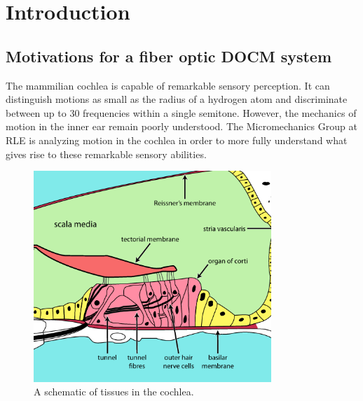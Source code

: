 \chapter{Introduction}


\section{Motivations for a fiber optic DOCM system}

\label{sec:intro}

The mammilian cochlea is capable of remarkable sensory perception. It can distinguish motions as small as the radius of a hydrogen atom and discriminate between up to 30 frequencies within a single semitone. \cite{ghafarri} However, the mechanics of motion in the inner ear remain poorly understood. The Micromechanics Group at RLE is  analyzing motion in the cochlea in order to more fully understand what gives rise to these remarkable sensory abilities.

\begin{figure}[h!]
  \centering
    \includegraphics[width=0.8\textwidth]{Images/Background/cochlea.png}
      \caption{A schematic of tissues in the cochlea.}
      \label{fig:cochlea}
\end{figure}

